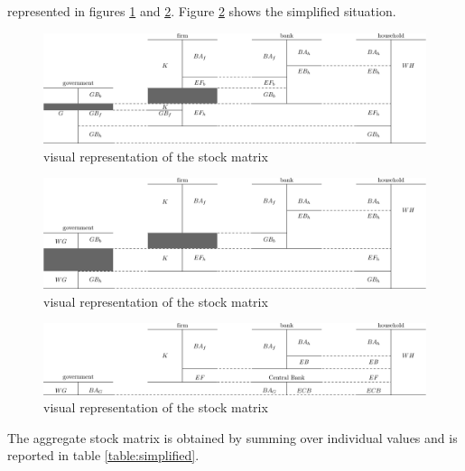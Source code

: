 \documentclass{article}
\begin{document}
represented in figures \ref{fig:vstock3} and \ref{fig:vstock4}.
Figure \ref{fig:vstock4} shows the simplified situation.   


\begin{figure}[p]
\hskip-3cm
\includegraphics[scale=0.8]{balances-3.pdf}
	\caption{visual representation of the stock matrix}
	\label{fig:vstock3}
\end{figure}

\begin{figure}[ht]
\hskip-3cm
\includegraphics[scale=0.8]{balances-4.pdf}
	\caption{visual representation of the stock matrix}
	\label{fig:vstock4}
\end{figure}
\fi

\begin{figure}[ht]
\hskip-3cm
\includegraphics[scale=0.8]{balances-5.pdf}
	\caption{visual representation of the stock matrix}
	\label{fig:vstock5}
\end{figure}



\clearpage
The aggregate stock matrix is obtained by summing over individual values and is reported in table \ref{table:simplified}.
\end{document}
